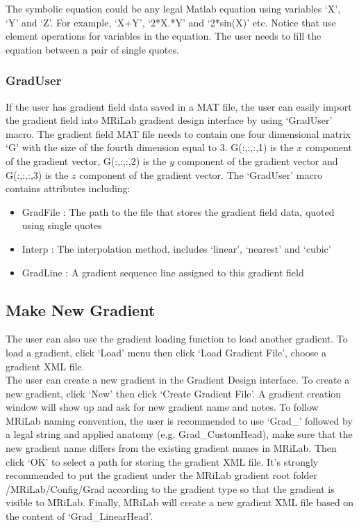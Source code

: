 \documentclass{book}%
\begin{document}
The symbolic equation could be any legal Matlab equation using variables `X', `Y' and `Z'. For example, `X+Y', `2*X.*Y' and `2*sin(X)' etc. Notice that use element operations for variables in the equation. The user needs to fill the equation between a pair of single quotes.

\subsubsection{GradUser}

If the user has gradient field data saved in a MAT file, the user can easily import the gradient field into MRiLab gradient design interface by using `GradUser' macro. The gradient field MAT file needs to contain one four dimensional matrix `G' with the size of the fourth dimension equal to 3. G(:,:,:,1) is the $x$ component of the gradient vector, G(:,:,:,2) is the $y$ component of the gradient vector and G(:,:,:,3) is the $z$ component of the gradient vector. The `GradUser' macro contains attributes including:

\begin{itemize}
	\item GradFile : The path to the file that stores the gradient field data, quoted using single quotes
	\item Interp : The interpolation method, includes `linear', `nearest' and `cubic'
	\item GradLine : A gradient sequence line assigned to this gradient field
\end{itemize}


\subsection{Make New Gradient}

The user can also use the gradient loading function to load another gradient. To load a gradient, click `Load' menu then click `Load Gradient File', choose a gradient XML file.\\

The user can create a new gradient in the Gradient Design interface. To create a new gradient, click `New' then click `Create Gradient File'. A gradient creation window will show up and ask for new gradient name and notes. To follow MRiLab naming convention, the user is recommended to use `Grad\_' followed by a legal string and applied anatomy (e.g. Grad\_CustomHead), make sure that the new gradient name differs from the existing gradient names in MRiLab. Then click `OK' to select a path for storing the gradient XML file. It's strongly recommended to put the gradient under the MRiLab gradient root folder /MRiLab/Config/Grad according to the gradient type so that the gradient is visible to MRiLab. Finally, MRiLab will create a new gradient XML file based on the content of `Grad\_LinearHead'.
\end{document}
